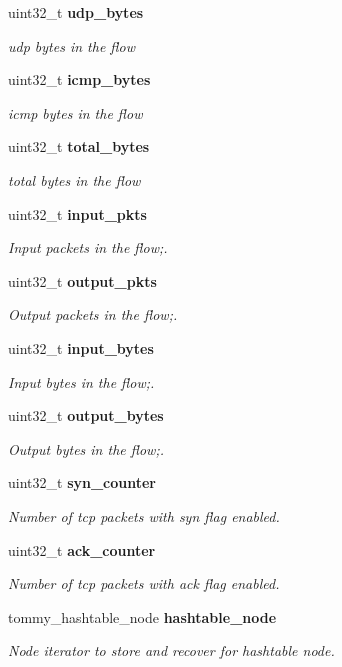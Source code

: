 \begin{DoxyCompactItemize}
uint32\+\_\+t {\bf udp\+\_\+bytes}
\begin{DoxyCompactList}\small\item\em udp bytes in the flow \end{DoxyCompactList}\item 
uint32\+\_\+t {\bf icmp\+\_\+bytes}
\begin{DoxyCompactList}\small\item\em icmp bytes in the flow \end{DoxyCompactList}\item 
uint32\+\_\+t {\bf total\+\_\+bytes}
\begin{DoxyCompactList}\small\item\em total bytes in the flow \end{DoxyCompactList}\item 
uint32\+\_\+t {\bf input\+\_\+pkts}
\begin{DoxyCompactList}\small\item\em Input packets in the flow;. \end{DoxyCompactList}\item 
uint32\+\_\+t {\bf output\+\_\+pkts}
\begin{DoxyCompactList}\small\item\em Output packets in the flow;. \end{DoxyCompactList}\item 
uint32\+\_\+t {\bf input\+\_\+bytes}
\begin{DoxyCompactList}\small\item\em Input bytes in the flow;. \end{DoxyCompactList}\item 
uint32\+\_\+t {\bf output\+\_\+bytes}
\begin{DoxyCompactList}\small\item\em Output bytes in the flow;. \end{DoxyCompactList}\item 
uint32\+\_\+t {\bf syn\+\_\+counter}
\begin{DoxyCompactList}\small\item\em Number of tcp packets with syn flag enabled. \end{DoxyCompactList}\item 
uint32\+\_\+t {\bf ack\+\_\+counter}
\begin{DoxyCompactList}\small\item\em Number of tcp packets with ack flag enabled. \end{DoxyCompactList}\item 
tommy\+\_\+hashtable\+\_\+node {\bf hashtable\+\_\+node}
\begin{DoxyCompactList}\small\item\em Node iterator to store and recover for hashtable node. \end{DoxyCompactList}\end{DoxyCompactItemize}


